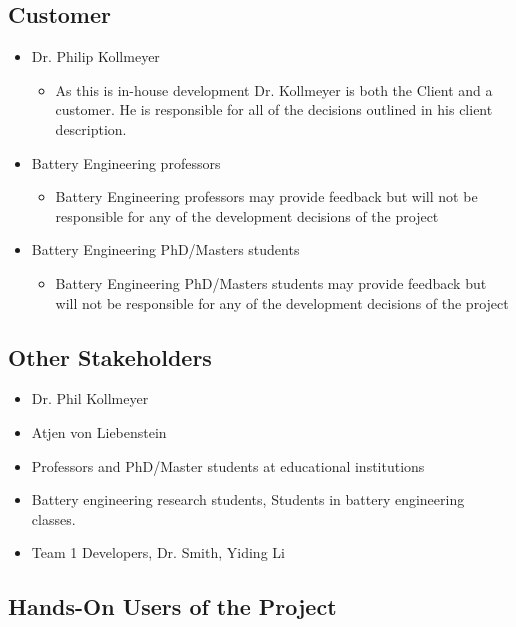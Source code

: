 \documentclass[12pt]{article}
\begin{document}
\subsection{Customer}
\begin{itemize}
    \item Dr. Philip Kollmeyer
    \begin{itemize} 
        \item As this is in-house development Dr. Kollmeyer is both the Client and a customer. He is responsible for all of the decisions outlined in his client description.
    \end{itemize}
    \item Battery Engineering professors
    \begin{itemize}
        \item Battery Engineering professors may provide feedback but will not be responsible for any of the development decisions of the project
    \end{itemize}
    \item Battery Engineering PhD/Masters students
    \begin{itemize}
        \item Battery Engineering PhD/Masters students may provide feedback but will not be responsible for any of the development decisions of the project
    \end{itemize}
\end{itemize}

\subsection{Other Stakeholders}

\begin{itemize}
    \item Dr. Phil Kollmeyer
    \item Atjen von Liebenstein
    \item Professors and PhD/Master students at educational institutions
    \item Battery engineering research students, Students in battery engineering classes.
    \item Team 1 Developers, Dr. Smith, Yiding Li
\end{itemize}

\subsection{Hands-On Users of the Project}
\end{document}
